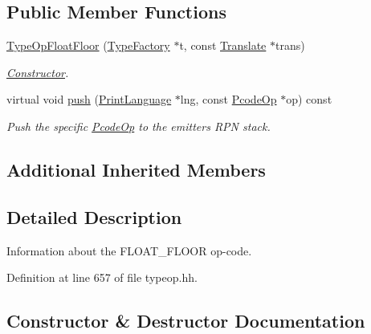 \subsection*{Public Member Functions}
\begin{DoxyCompactItemize}
\item 
\mbox{\hyperlink{class_type_op_float_floor_a80e66bcf163b91fd6861ae830a8e91ae}{Type\+Op\+Float\+Floor}} (\mbox{\hyperlink{class_type_factory}{Type\+Factory}} $\ast$t, const \mbox{\hyperlink{class_translate}{Translate}} $\ast$trans)
\begin{DoxyCompactList}\small\item\em \mbox{\hyperlink{class_constructor}{Constructor}}. \end{DoxyCompactList}\item 
virtual void \mbox{\hyperlink{class_type_op_float_floor_ab361c274c7e25f09ebe16562fe012f24}{push}} (\mbox{\hyperlink{class_print_language}{Print\+Language}} $\ast$lng, const \mbox{\hyperlink{class_pcode_op}{Pcode\+Op}} $\ast$op) const
\begin{DoxyCompactList}\small\item\em Push the specific \mbox{\hyperlink{class_pcode_op}{Pcode\+Op}} to the emitter\textquotesingle{}s R\+PN stack. \end{DoxyCompactList}\end{DoxyCompactItemize}
\subsection*{Additional Inherited Members}


\subsection{Detailed Description}
Information about the F\+L\+O\+A\+T\+\_\+\+F\+L\+O\+OR op-\/code. 

Definition at line 657 of file typeop.\+hh.



\subsection{Constructor \& Destructor Documentation}
\mbox{\label{class_type_op_float_floor_a80e66bcf163b91fd6861ae830a8e91ae}} 
